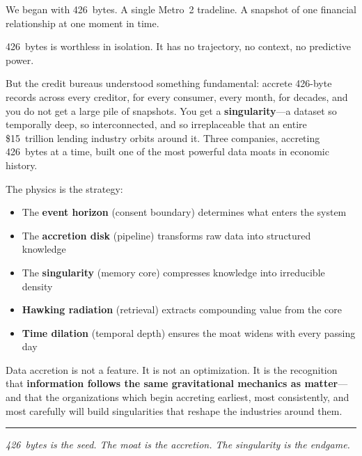 \documentclass[11pt,twocolumn]{article}
\begin{document}
We began with 426~bytes. A single Metro~2 tradeline. A snapshot of one financial relationship at one moment in time.

426~bytes is worthless in isolation. It has no trajectory, no context, no predictive power.

But the credit bureaus understood something fundamental: accrete 426-byte records across every creditor, for every consumer, every month, for decades, and you do not get a large pile of snapshots. You get a \textbf{singularity}---a dataset so temporally deep, so interconnected, and so irreplaceable that an entire \$15~trillion lending industry orbits around it. Three companies, accreting 426~bytes at a time, built one of the most powerful data moats in economic history.

The physics is the strategy:

\begin{itemize}[nosep,leftmargin=1.2em]
  \item The \textbf{event horizon} (consent boundary) determines what enters the system
  \item The \textbf{accretion disk} (pipeline) transforms raw data into structured knowledge
  \item The \textbf{singularity} (memory core) compresses knowledge into irreducible density
  \item \textbf{Hawking radiation} (retrieval) extracts compounding value from the core
  \item \textbf{Time dilation} (temporal depth) ensures the moat widens with every passing day
\end{itemize}

Data accretion is not a feature. It is not an optimization. It is the recognition that \textbf{information follows the same gravitational mechanics as matter}---and that the organizations which begin accreting earliest, most consistently, and most carefully will build singularities that reshape the industries around them.

\vspace{6pt}
\noindent\rule{\columnwidth}{0.4pt}

\noindent\emph{426~bytes is the seed. The moat is the accretion. The singularity is the endgame.}

\end{document}
